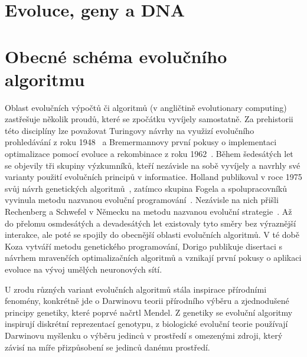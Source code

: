 
\section{Evoluce, geny a DNA}


\section{Obecné schéma evolučního algoritmu}

Oblast evolučních výpočtů či algoritmů (v angličtině evolutionary computing) zastřešuje několik proudů, které se zpočátku vyvíjely samostatně. Za prehistorii této disciplíny lze považovat Turingovy návrhy na využizí evolučního prohledávání z roku 1948~\cite{Turing:1948} a Bremermannovy první pokusy o implementaci optimalizace pomocí evoluce a rekombinace z roku 1962~\cite{Bremermann:1962}. Během šedesátých let se objevily tři skupiny výzkumníků, kteří nezávisle na sobě vyvíjely a navrhly své varianty použití evolučních principů v informatice. Holland publikoval v roce 1975 svůj návrh genetických algoritmů~\cite{Holland:1992}, 
zatímco skupina Fogela a spolupracovníků vyvinula metodu nazvanou evoluční programování~\cite{Fogel:1995}. 
Nezávisle na nich přišli Rechenberg a Schwefel v Německu na metodu nazvanou evoluční strategie~\cite{Beyer:2002}.
Až do přelomu osmdesátých a devadesátých let existovaly tyto směry bez výraznější interakce, ale poté se spojily do obecnější oblasti evolučních algoritmů. V té době  Koza vytváří metodu genetického programování, Dorigo publikuje disertaci s návrhem mravenčích optimalizačních algoritmů a vznikají první pokusy o aplikaci evoluce na vývoj umělých neuronových sítí. 

U zrodu různých variant evolučních algoritmů stála inspirace přírodními fenomény, konkrétně jde o Darwinovu teorii přírodního výběru a zjednodušené principy genetiky, které poprvé načrtl Mendel. Z genetiky se evoluční algoritmy inspirují diskrétní reprezentací genotypu, z biologické evoluční teorie používají Darwinovu myšlenku o výběru jedinců v prostředí s omezenými zdroji, který závisí na míře přizpůsobení se jedinců danému prostředí.


